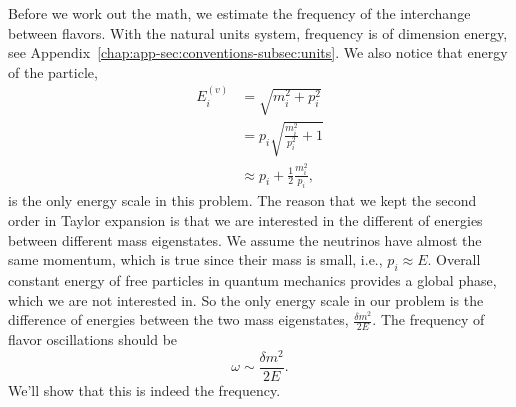 Before we work out the math, we estimate the frequency of the interchange between flavors. With the natural units system, frequency is of dimension energy, see Appendix~\ref{chap:app-sec:conventions-subsec:units}. We also notice that energy of the particle,
\begin{align}
E_i^{(v)} & = \sqrt{m_i^2 + p_i^2 } \\
& = p_i \sqrt{\frac{m_i^2}{p_i^2} + 1} \\
& \approx p_i + \frac{1}{2} \frac{m_i^2}{p_i},
\label{chap:basics-section:neutrinos-eqn:energy-taylor}
\end{align}
is the only energy scale in this problem. The reason that we kept the second order in Taylor expansion is that we are interested in the different of energies between different mass eigenstates. We assume the neutrinos have almost the same momentum, which is true since their mass is small, i.e., $p_i \approx E$. Overall constant energy of free particles in quantum mechanics provides a global phase, which we are not interested in. So the only energy scale in our problem is the difference of energies between the two mass eigenstates, $\frac{\delta m^2}{2E}$. The frequency of flavor oscillations should be
\begin{equation}
    \omega \sim \frac{\delta m^2}{2E}.
    \label{chap:basics-section:neutrinos-eqn:qualitative-method-frequency}
\end{equation}
We'll show that this is indeed the frequency.

